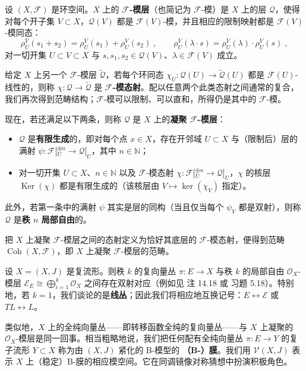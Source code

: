\begin{Def}\label{def:7.16}
设 $(X,\mathcal F)$ 是环空间。$X$ 上的 \textbf{$\mathcal F$-模层}（也简记为 $\mathcal F$-模）是 $X$ 上的层 $\mathcal Q$，使得对每个开子集 $V\subset X$，$\mathcal Q(V)$ 都是 $\mathcal F(V)$-模，并且相应的限制映射都是 $\mathcal F(V)$-模同态：
\[
\rho_U^V(s_1+s_2)=\rho_U^V(s_1)+\rho_U^V(s_2)\;,\qquad
\rho_U^V(\lambda\cdot s)=\rho_U^V(\lambda)\cdot\rho_U^V(s)\;,
\]
对一切开集 $U\subset V\subset X$ 与 $s,s_1,s_2\in\mathcal Q(V)$、$\lambda\in\mathcal F(V)$ 成立。
\end{Def}

给定 $X$ 上另一个 $\mathcal F$-模层 $\tilde{\mathcal Q}$，若每个环同态 $\chi_U:\mathcal Q(U)\to\tilde{\mathcal Q}(U)$ 都是 $\mathcal F(U)$-线性的，则称 $\chi:\mathcal Q\to\tilde{\mathcal Q}$ 是 \textbf{$\mathcal F$-模态射}。配以任意两个此类态射之间通常的复合，我们再次得到范畴结构；$\mathcal F$-模可以限制、可以直和，所得仍是其中的 $\mathcal F$-模。

现在，若还满足以下两条，则称 $\mathcal Q$ 是 $X$ 上的\textbf{凝聚 $\mathcal F$-模层}：
\begin{itemize}
  \item $\mathcal Q$ 是\textbf{有限生成}的，即对每个点 $x\in X$，存在开邻域 $U\subset X$ 与（限制后）层的满射 $\psi:\mathcal F|_U^{\oplus n}\to\mathcal Q|_U$，其中 $n\in\mathbb N$；
  \item 对一切开集 $U\subset X$、$n\in\mathbb N$ 以及 $\mathcal F$-模态射 $\chi:\mathcal F|_U^{\oplus n}\to\mathcal Q|_U$，$\chi$ 的核层 $\operatorname{Ker}(\chi)$ 都是有限生成的（该核层由 $V\mapsto\ker(\chi_V)$ 指定）。
\end{itemize}
此外，若第一条中的满射 $\psi$ 其实是层的同构（当且仅当每个 $\psi_V$ 都是双射），则称 $\mathcal Q$ 是\textbf{秩 $n$ 局部自由}的。

把 $X$ 上凝聚 $\mathcal F$-模层之间的态射定义为恰好其底层的 $\mathcal F$-模态射，便得到范畴 $\operatorname{Coh}(X,\mathcal F)$，即 $X$ 上凝聚 $\mathcal F$-模层的范畴。

\begin{Rem}\label{rem:7.17}
设 $X=(X,J)$ 是复流形。则秩 $k$ 的复向量丛 $\pi:E\to X$ 与秩 $k$ 的局部自由 $\mathcal O_X$-模层 $\mathcal E_E\cong\bigoplus_{i=1}^{k}\mathcal O_X$ 之间存在双射对应（例如见 \cite{Gat20} 注 14.18 或 \cite{Har77} 习题 5.18）。特别地，若 $k=1$，我们谈论的是\textbf{线丛}；因此我们将相应地互换记号：$E\leftrightarrow\mathcal E$ 或 $TL\leftrightarrow L$。

类似地，$X$ 上的全纯向量丛——即转移函数全纯的复向量丛——与 $X$ 上凝聚的 $\mathcal O_X$-模层是同一回事。相当粗略地说，我们把任何配有全纯向量丛 $\pi:E\to Y$ 的复子流形 $Y\subset X$ 称为由 $(X,J)$ 紧化的 B-模型的 \textbf{（B-）膜}。我们用 $\mathcal V(X,J)$ 表示 $X$ 上（稳定）B-膜的相应模空间。它在同调镜像对称猜想中扮演积极角色。
\end{Rem}

